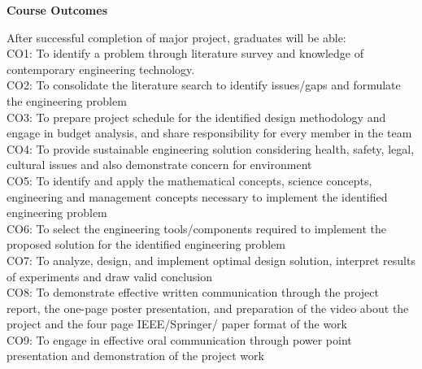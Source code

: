 \begin{titlepage}
\begin{center}
{\Large \textbf{Course Outcomes}}
\end{center}
After successful completion of major project, graduates will be able:\\
CO1: To identify a problem through literature survey and knowledge of contemporary engineering technology. \\      
CO2: To consolidate the literature search to identify issues/gaps and formulate the engineering problem \\
CO3: To prepare project schedule for the identified design methodology and engage in budget analysis, and share responsibility for every member in the team\\
CO4: To provide sustainable  engineering solution considering health, safety, legal, cultural issues and also demonstrate concern for environment \\
CO5: To identify and apply the mathematical concepts, science concepts, engineering and management concepts necessary to implement the identified engineering problem \\
CO6: To select the engineering tools/components required to implement the proposed solution for the identified engineering problem\\
CO7: To analyze, design, and implement optimal design solution, interpret results of  experiments and draw valid conclusion \\
CO8: To demonstrate effective written communication through the project report, the one-page poster presentation, and preparation of the video about the project and the four page IEEE/Springer/ paper format of the work\\
CO9: To engage in effective oral communication through power point presentation and demonstration of the project work\\ 

\end{titlepage}
